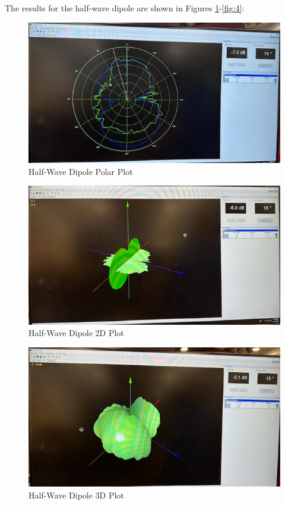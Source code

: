 \documentclass[
	letterpaper, %
	10pt, %
]{CSUniSchoolLabReport}
\begin{document}
The results for the half-wave dipole are shown in Figures \ref{fig:1}-\ref{fig:4}:

\begin{figure}[H]
  \centering
  \includegraphics[width=.8\textwidth]{Figures/Lab Five/HWD-Polar.jpg}
  \caption{Half-Wave Dipole Polar Plot}
  \label{fig:1}
\end{figure}

\begin{figure}[H]
  \centering
  \includegraphics[width=.8\textwidth]{Figures/Lab Five/HWD-2D.jpg}
  \caption{Half-Wave Dipole 2D Plot}
  \label{fig:2}
\end{figure}

\begin{figure}[H]
  \centering
  \includegraphics[width=.8\textwidth]{Figures/Lab Five/HWD-3D.jpg}
  \caption{Half-Wave Dipole 3D Plot}
  \label{fig:3}
\end{figure}
\end{document}
